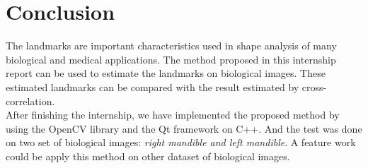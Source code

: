 \chapter{Conclusion}
\indent The landmarks are important characteristics used in shape analysis of many biological and medical applications. The method proposed in this internship report can be used to estimate the landmarks on biological images. These estimated landmarks can be compared with the result estimated by cross-correlation.\\[0.2cm]
\indent After finishing the internship, we have implemented the proposed method by using the OpenCV library and the Qt framework on C++. And the test was done on two set of biological images: \textit{right mandible and left mandible}. A feature work could be apply this method on other dataset of biological images.